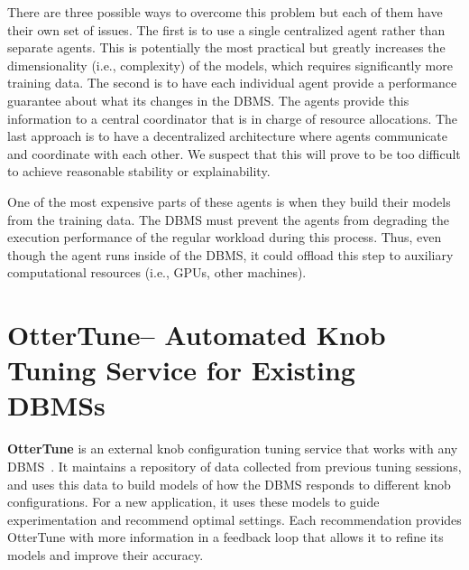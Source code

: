\documentclass[11pt,times]{article}
\newcommand{\ottertune}{OtterTune\xspace}
\begin{document}
There are three possible ways to overcome this problem but each of them have their own set of 
issues. The first is to use a single centralized agent rather than separate agents. This 
is potentially the most practical but greatly increases the dimensionality (i.e., complexity) of 
the models, which requires significantly more training data. The second is to have each individual 
agent provide a 
performance guarantee about what its changes in the DBMS. The agents provide this information to 
a central coordinator that is in charge of resource allocations.
The last approach is to have a decentralized architecture where agents communicate and coordinate 
with each other. We suspect that this will prove to be too difficult to achieve reasonable 
stability or explainability.


One of the most expensive parts of these agents is when they build their models from 
the training data. The DBMS must prevent the agents from degrading the execution performance of the 
regular workload during this process. Thus, even though the agent runs inside of the DBMS, it could 
offload this step to auxiliary computational resources (i.e., GPUs, other machines).


\section{\ottertune$ $-- Automated Knob Tuning Service for Existing DBMSs}
\label{sec:ottertune}
\textbf{\ottertune} is an external knob configuration tuning service that works with any 
DBMS~\cite{vanaken17,zhang18-ottertune,ottertune}.
It maintains a repository of data collected from previous tuning
sessions, and uses this data to build models of how the DBMS responds
to different knob configurations. For a new application, it uses
these models to guide experimentation and recommend optimal settings.
Each recommendation provides \ottertune with more information in a feedback loop that 
allows it to refine its models and improve their accuracy.
\end{document}

